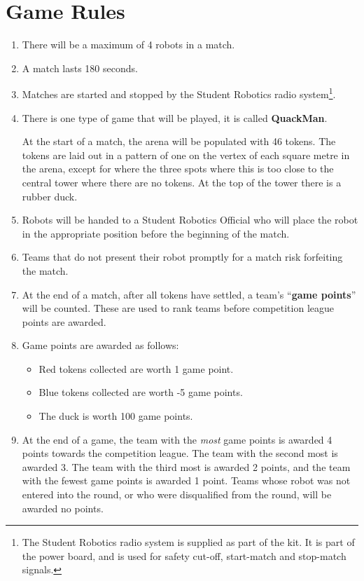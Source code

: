 \section {Game Rules}
\label{game-rules}

\begin{enumerate}
\item There will be a maximum of 4 robots in a match.
\item A match lasts 180 seconds.
\item Matches are started and stopped by the Student Robotics radio system\footnote{The Student Robotics radio system is supplied as part of the kit.
 It is part of the power board, and is used for safety cut-off, start-match and stop-match signals.}.
\item There is one type of game that will be played, it is called \textbf{QuackMan}.

At the start of a match, the arena will be populated with 46 tokens.
The tokens are laid out in a pattern of one on the vertex of each square metre in the arena, except for where the three spots where this is too close to the central tower where there are no tokens.
At the top of the tower there is a rubber duck.

\item Robots will be handed to a Student Robotics Official who will place the robot in the appropriate position before the beginning of the match.
\item Teams that do not present their robot promptly for a match risk forfeiting the match.

\item At the end of a match, after all tokens have settled, a team's ``\textbf{game points}'' will be counted.
 These are used to rank teams before competition league points are awarded.

\item Game points are awarded as follows:
\begin{itemize}
\item Red tokens collected are worth 1 game point.
\item Blue tokens collected are worth -5 game points.
\item The duck is worth 100 game points.
\end{itemize}

\item At the end of a game, the team with the \emph{most} game points is awarded 4 points towards the competition league.
 The team with the second most is awarded 3.
 The team with the third most is awarded 2 points, and the team with the fewest game points is awarded 1 point.
 Teams whose robot was not entered into the round, or who were disqualified from the round, will be awarded no points.

\end{enumerate}
